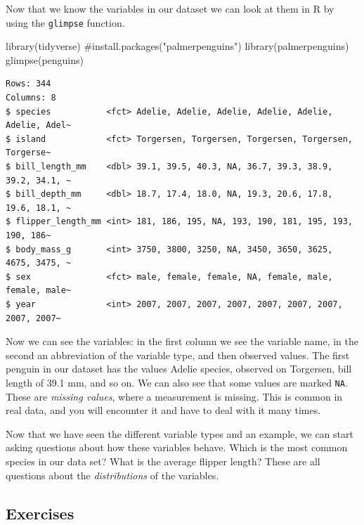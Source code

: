 \documentclass[
  letterpaper,
  DIV=11,
  numbers=noendperiod]{scrreprt}
\newenvironment{Shaded}{\begin{snugshade}}{\end{snugshade}}
\newcommand{\CommentTok}[1]{\textcolor[rgb]{0.37,0.37,0.37}{#1}}
\newcommand{\FunctionTok}[1]{\textcolor[rgb]{0.28,0.35,0.67}{#1}}
\newcommand{\NormalTok}[1]{\textcolor[rgb]{0.00,0.23,0.31}{#1}}
\begin{document}
Now that we know the variables in our dataset we can look at them in R
by using the \texttt{glimpse} function.

\begin{Shaded}
\begin{Highlighting}[]
\FunctionTok{library}\NormalTok{(tidyverse)}
\CommentTok{\#install.packages("palmerpenguins")}
\FunctionTok{library}\NormalTok{(palmerpenguins)}
\FunctionTok{glimpse}\NormalTok{(penguins)}
\end{Highlighting}
\end{Shaded}

\begin{verbatim}
Rows: 344
Columns: 8
$ species           <fct> Adelie, Adelie, Adelie, Adelie, Adelie, Adelie, Adel~
$ island            <fct> Torgersen, Torgersen, Torgersen, Torgersen, Torgerse~
$ bill_length_mm    <dbl> 39.1, 39.5, 40.3, NA, 36.7, 39.3, 38.9, 39.2, 34.1, ~
$ bill_depth_mm     <dbl> 18.7, 17.4, 18.0, NA, 19.3, 20.6, 17.8, 19.6, 18.1, ~
$ flipper_length_mm <int> 181, 186, 195, NA, 193, 190, 181, 195, 193, 190, 186~
$ body_mass_g       <int> 3750, 3800, 3250, NA, 3450, 3650, 3625, 4675, 3475, ~
$ sex               <fct> male, female, female, NA, female, male, female, male~
$ year              <int> 2007, 2007, 2007, 2007, 2007, 2007, 2007, 2007, 2007~
\end{verbatim}

Now we can see the variables: in the first column we see the variable
name, in the second an abbreviation of the variable type, and then
observed values. The first penguin in our dataset has the values Adelie
species, observed on Torgersen, bill length of 39.1 mm, and so on. We
can also see that some values are marked \texttt{NA}. These are
\emph{missing values}, where a measurement is missing. This is common in
real data, and you will encounter it and have to deal with it many
times.

Now that we have seen the different variable types and an example, we
can start asking questions about how these variables behave. Which is
the most common species in our data set? What is the average flipper
length? These are all questions about the \emph{distributions} of the
variables.

\subsection{Exercises}\label{exercises-5}
\end{document}
